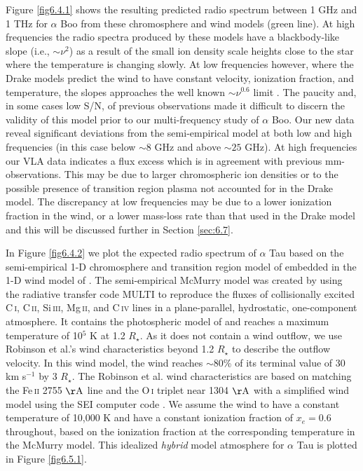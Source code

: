 Figure \ref{fig6.4.1} shows the resulting predicted radio spectrum between 1 GHz and 1 THz for $\alpha$ Boo from these chromosphere and wind models (green line). At high frequencies the radio spectra produced by these models have a blackbody-like slope (i.e., $\sim \nu ^{2}$) as a result of the small ion density scale heights close to the star where the temperature is changing slowly. At low frequencies however, where the Drake models predict the wind to have constant velocity, ionization fraction, and temperature, the slopes approaches the well known $\sim\nu ^{0.6}$ limit \citep{wright_1975,olnon_1975,panagia_1975}. The paucity and, in some cases low S/N, of previous observations made it difficult to discern the validity of this model prior to our multi-frequency study of $\alpha$ Boo. Our new data reveal significant deviations from the semi-empirical model at both low and high frequencies (in this case below $\sim 8$ GHz and above $\sim 25$ GHz). At high frequencies our VLA data indicates a flux excess which is in agreement with previous mm-observations. This may be due to larger chromospheric ion densities or to the possible presence of transition region plasma not accounted for in the Drake model. The discrepancy at low frequencies may be due to a lower ionization fraction in the wind, or a lower mass-loss rate than that used in the Drake model and this will be discussed further in Section \ref{sec:6.7}.

In Figure \ref{fig6.4.2} we plot the expected radio spectrum of $\alpha$ Tau based on the semi-empirical 1-D chromosphere and transition region model of \cite{mcmurry_1999} embedded in the 1-D wind model of \cite{robinson_1998}. The semi-empirical McMurry model was created by using the radiative transfer code MULTI \citep{carlsson_1986} to reproduce the fluxes of collisionally excited C\,\textsc{i}, C\,\textsc{ii}, Si\,\textsc{iii}, Mg\,\textsc{ii}, and C\,\textsc{iv} lines in a plane-parallel, hydrostatic, one-component atmosphere. It contains the photospheric model of \cite{johnson_1973} and reaches a maximum temperature of 10$^{5}$ K at 1.2 $R_{\star}$. As it does not contain a wind outflow, we use Robinson et al.'s wind characteristics beyond 1.2 $R_{\star}$ to describe the outflow velocity. In this wind model, the wind reaches $\sim$80\% of its terminal value of 30 km s$^{-1}$ by 3 $R_{\star}$. The Robinson et al. wind characteristics are based on matching the Fe\,\textsc{ii} 2755 $\rm{\AA}$ line and the O\,\textsc{i} triplet near 1304 $\rm{\AA}$ with a simplified wind model using the SEI computer code \citep{lamers_1987}. We assume the wind to have a constant temperature of 10,000 K and have a constant ionization fraction of $x_{e} = 0.6$ throughout, based on the ionization fraction at the corresponding temperature in the McMurry model. This idealized \textit{hybrid} model atmosphere for $\alpha$ Tau is plotted in Figure \ref{fig6.5.1}.

